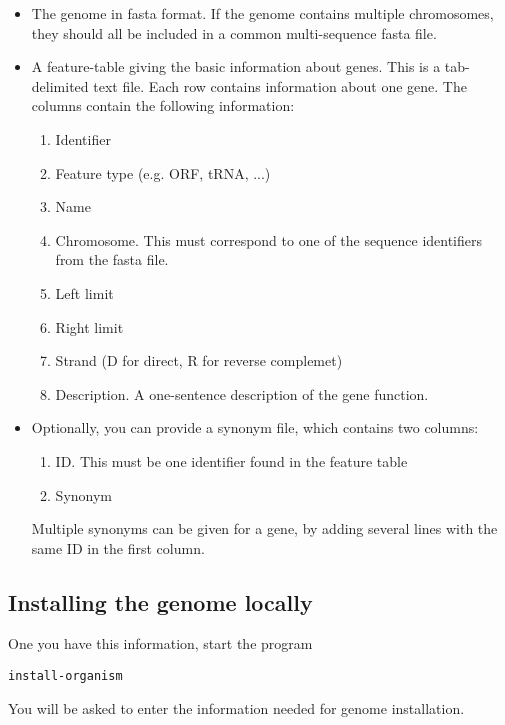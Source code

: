 \begin{itemize}
\item The genome in fasta format. If the genome contains multiple
chromosomes, they should all be included in a common multi-sequence
fasta file.

\item A feature-table giving the basic information about genes. This is
a tab-delimited text file. Each row contains information about one
gene. The columns contain the following information: 
\begin{enumerate}

\item Identifier

\item Feature type (e.g. ORF, tRNA, ...)

\item Name

\item Chromosome. This must correspond to one of the sequence
identifiers from the fasta file.

\item Left limit

\item Right limit

\item Strand (D for direct, R for reverse complemet)

\item Description. A one-sentence description of the gene function.

\end{enumerate}

\item Optionally, you can provide a synonym file, which contains two
columns:

\begin{enumerate}
\item ID. This must be one identifier found in the feature table
\item Synonym
\end{enumerate}

Multiple synonyms can be given for a gene, by adding several lines with
the same ID in the first column.

\end{itemize}

\subsection{Installing the genome locally}
One you have this information, start the program
\begin{verbatim}
install-organism
\end{verbatim}
You will be asked to enter the information needed for genome installation. 

